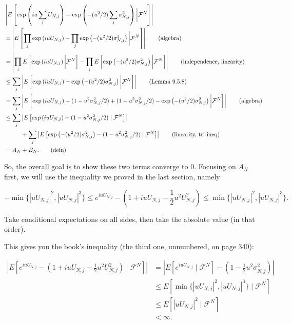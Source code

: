 \documentclass{article}
\begin{document}
\begin{align*}
&  \left| E\left[\exp\left( i u \sum_j U_{N,j} \right) -  \exp\left( -(u^2/2) \sum_j \sigma^2_{N,j}  \right)  \bigg\rvert \mathcal{F}^N \right] \right| \\
&=  \left| E\left[ \prod_j \exp\left( i u  U_{N,j} \right) -  \prod_j \exp\left( -(u^2/2) \sigma^2_{N,j}  \right)  \bigg\rvert \mathcal{F}^N \right] \right| \tag{algebra}\\
&=  \left|  \prod_j E\left[ \exp\left( i u  U_{N,j} \right)\bigg\rvert \mathcal{F}^N \right] -  \prod_j E\left[\exp\left( -(u^2/2) \sigma^2_{N,j}  \right)  \bigg\rvert \mathcal{F}^N \right] \right| \tag{independence, linearity} \\
&\le  \sum_j \left| E\left[  \exp\left( i u  U_{N,j} \right) - \exp\left( -(u^2/2) \sigma^2_{N,j}  \right)  \bigg\rvert \mathcal{F}^N \right] \right| \tag{Lemma 9.5.8}\\
&=  \sum_j \left| E\left[  \exp\left( i u  U_{N,j} \right) - (1 - u^2 \sigma^2_{N,j}/2) + (1 - u^2 \sigma^2_{N,j}/2) -\exp\left( -(u^2/2) \sigma^2_{N,j}  \right)  \bigg\rvert \mathcal{F}^N \right] \right|  \tag{algebra}\\
&\le \sum_j \left| E\left[   \exp\left( i u U_{N,j} \right)  - (1 - u^2 \sigma^2_{N,j}/2) \mid \mathcal{F}^N \right] \right|  \\
&\hspace{10mm} + \sum_j  \left|E\left[  \exp\left( -(u^2/2) \sigma^2_{N,j}  \right) - (1 - u^2 \sigma^2_{N,j}/2)   \mid \mathcal{F}^N \right] \right| \tag{linearity, tri-ineq} \\
&= A_N + B_N. \tag{defn}
\end{align*}

So, the overall goal is to show these two terms converge to $0$. 
Focusing on $A_N$ first, we will use the inequality we proved in the last section, namely 

\[
-\min\{| u U_{N,j}|^2, | u U_{N,j}|^3 \} \le e^{i u U_{N,j}} - (1 +i u U_{N,j} - \frac{1}{2} u^2 U_{N,j}^2) \le \min\{| u U_{N,j}|^2, | u U_{N,j}|^3 \}.
\]

Take conditional expectations on all sides, then take the absolute value (in that order). 

This gives you the book's inequality (the third one, unnumbered, on page 340):

\begin{align*}
\left| E\left[e^{i u U_{N,j}} - (1 +i u U_{N,j} - \frac{1}{2} u^2 U_{N,j}^2) \mid \mathcal{F}^N \right]  \right| 
&= \left| E\left[e^{i u U_{N,j}}\mid \mathcal{F}^N \right] - (1  - \frac{1}{2} u^2 \sigma^2_{N,j})   \right|\\
&\le E\left[ \min\{| u U_{N,j}|^2, | u U_{N,j}|^3 \} \mid \mathcal{F}^N \right] \\
&\le E\left[ | u U_{N,j}|^2 \mid \mathcal{F}^N \right] \\
&<\infty \tag{assumption}.
\end{align*}
\end{document}
